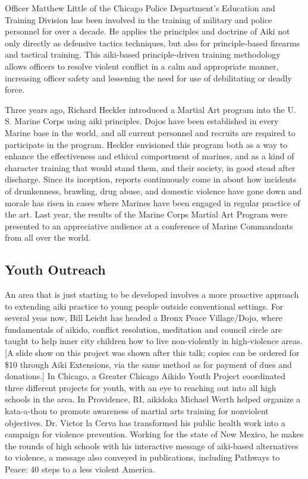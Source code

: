 Officer Matthew Little of the Chicago Police Department's Education and Training Division has been involved in the training of military and police personnel for over a decade. He applies the principles and doctrine of Aiki not only directly as defensive tactics techniques, but also for principle-based firearms and tactical training. This aiki-based principle-driven training methodology allows officers to resolve violent conflict in a calm and appropriate manner, increasing officer safety and lessening the need for use of debilitating or deadly force.

Three years ago, Richard Heckler introduced a Martial Art program into the U. S. Marine Corps using aiki principles. Dojos have been established in every Marine base in the world, and all current personnel and recruits are required to participate in the program. Heckler envisioned this program both as a way to enhance the effectiveness and ethical comportment of marines, and as a kind of character training that would stand them, and their society, in good stead after discharge. Since its inception, reports continuously come in about how incidents of drunkenness, brawling, drug abuse, and domestic violence have gone down and morale has risen in cases where Marines have been engaged in regular practice of the art. Last year, the results of the Marine Corps Martial Art Program were presented to an appreciative audience at a conference of Marine Commandants from all over the world.

\subsection*{Youth Outreach}

An area that is just starting to be developed involves a more proactive approach to extending aiki practice to young people outside conventional settings. For several yeas now, Bill Leicht has headed a Bronx Peace Village/Dojo, where fundamentals of aikido, conflict resolution, meditation and council circle are taught to help inner city children how to live non-violently in high-violence areas. [A slide show on this project was shown after this talk; copies can be ordered for \$10 through Aiki Extensions, via the same method as for payment of dues and donations.] In Chicago, a Greater Chicago Aikido Youth Project coordinated three different projects for youth, with an eye to reaching out into all high schools in the area. In Providence, RI, aikidoka Michael Werth helped organize a kata-a-thon to promote awareness of martial arts training for nonviolent objectives. Dr. Victor la Cerva has transformed his public health work into a campaign for violence prevention. Working for the state of New Mexico, he makes the rounds of high schools with his interactive message of aiki-based alternatives to violence, a message also conveyed in publications, including Pathways to Peace: 40 steps to a less violent America.

